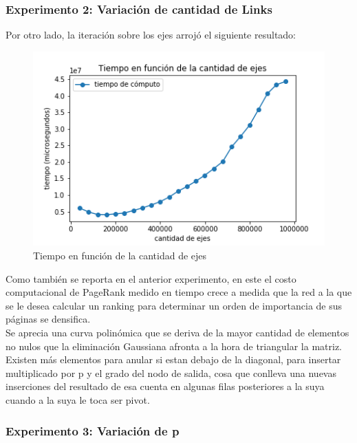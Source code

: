 \subsubsection{Experimento 2: Variación de cantidad de Links}

Por otro lado, la iteración sobre los ejes arrojó el siguiente resultado:

\begin{figure}[H]
   \begin{center}
     \includegraphics{img/tiempo_ejes_solo.png} 
  \end{center}
\caption{Tiempo en función de la cantidad de ejes} \label{fig:exp1-ejes}
\end{figure}

Como también se reporta en el anterior experimento, en este el costo computacional de PageRank medido en tiempo crece a medida que la red a la que se le desea calcular un ranking para determinar un orden de importancia de sus páginas se densifica. \\

Se aprecia una curva polinómica que se deriva de la mayor cantidad de elementos no nulos que la eliminación Gaussiana afronta a la hora de triangular la matriz. Existen más elementos para anular si estan debajo de la diagonal, para insertar multiplicado por p y el grado del nodo de salida, cosa que conlleva una nuevas inserciones del resultado de esa cuenta en algunas filas posteriores a la suya cuando a la suya le toca ser pivot. \\
 
\newpage

\subsubsection{Experimento 3: Variación de p}


